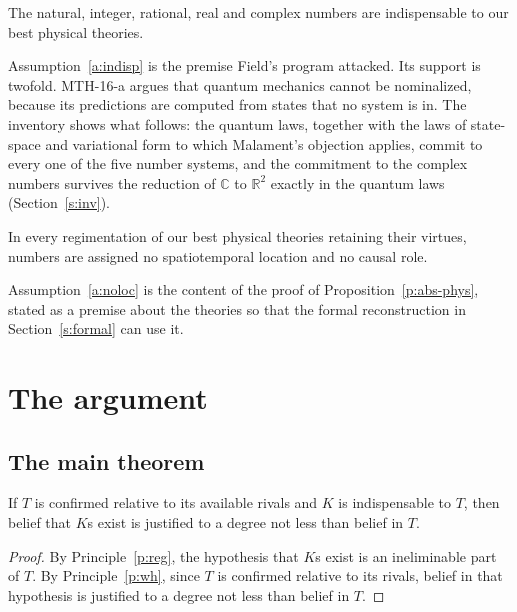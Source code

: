 \documentclass{situationist-preprint}
\begin{document}
\begin{assumption}\label{a:indisp}
The natural, integer, rational, real and complex numbers are indispensable to our best physical theories.
\end{assumption}

Assumption~\ref{a:indisp} is the premise Field's program attacked. Its support is twofold. MTH-16-a argues that quantum mechanics cannot be nominalized, because its predictions are computed from states that no system is in. The inventory shows what follows: the quantum laws, together with the laws of state-space and variational form to which Malament's objection applies, commit to every one of the five number systems, and the commitment to the complex numbers survives the reduction of $\mathbb C$ to $\mathbb R^2$ exactly in the quantum laws (Section~\ref{s:inv}).

\begin{assumption}\label{a:noloc}
In every regimentation of our best physical theories retaining their virtues, numbers are assigned no spatiotemporal location and no causal role.
\end{assumption}

Assumption~\ref{a:noloc} is the content of the proof of Proposition~\ref{p:abs-phys}, stated as a premise about the theories so that the formal reconstruction in Section~\ref{s:formal} can use it.

\section{The argument}\label{s:arg}

\subsection{The main theorem}

\begin{lemma}[Commitment]\label{l:commit}
If $T$ is confirmed relative to its available rivals and $K$ is indispensable to $T$, then belief that $K$s exist is justified to a degree not less than belief in $T$.
\end{lemma}

\begin{proof}
By Principle~\ref{p:reg}, the hypothesis that $K$s exist is an ineliminable part of $T$. By Principle~\ref{p:wh}, since $T$ is confirmed relative to its rivals, belief in that hypothesis is justified to a degree not less than belief in $T$.
\end{proof}
\end{document}
